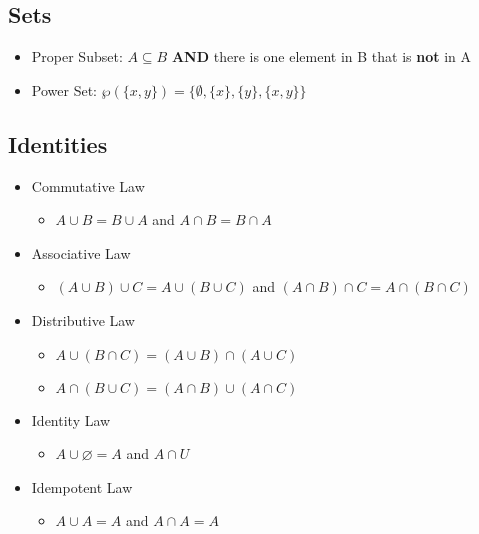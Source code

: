 \documentclass[landscape, letterpaper]{article}
\begin{document}
\begin{multicols}{2}
    \section*{Sets}
    \begin{itemize}
        \item Proper Subset: $A \subseteq B$ \textbf{AND} there is one element in B that is \textbf{not} in A
        \item Power Set: $\wp(\{x, y\}) = \{\emptyset, \{x\}, \{y\}, \{x, y\}\}$
    \end{itemize}
    \subsection*{Identities}
    \begin{itemize}
        \item Commutative Law
              \begin{itemize}
                  \item $A \cup B = B \cup A $ and $A \cap B = B \cap A$
              \end{itemize}
        \item Associative Law
              \begin{itemize}
                  \item $(A \cup B) \cup C = A \cup (B \cup C)$ and $(A \cap B) \cap C = A \cap (B \cap C)$
              \end{itemize}
        \item Distributive Law
              \begin{itemize}
                  \item $A \cup (B \cap C) = (A \cup B) \cap (A \cup C)$
                  \item $A \cap (B \cup C) = (A \cap B) \cup (A \cap C)$
              \end{itemize}
        \item Identity Law
              \begin{itemize}
                  \item $A \cup \varnothing = A$ and $A \cap U$
              \end{itemize}
        \item Idempotent Law
              \begin{itemize}
                  \item $A \cup A = A$ and $A\cap A = A$
              \end{itemize}

\end{itemize}
\end{multicols}
\end{document}
